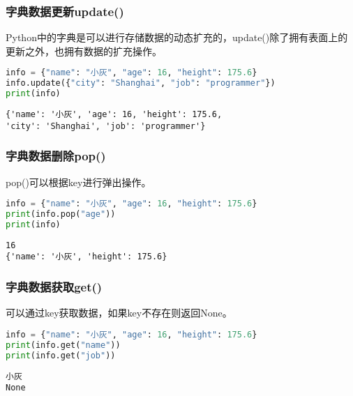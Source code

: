 \subsubsection{字典数据更新update()}

Python中的字典是可以进行存储数据的动态扩充的，update()除了拥有表面上的更新之外，也拥有数据的扩充操作。\\


\begin{lstlisting}[language=Python]
info = {"name": "小灰", "age": 16, "height": 175.6}
info.update({"city": "Shanghai", "job": "programmer"})
print(info)
\end{lstlisting}

\begin{tcolorbox}
	\begin{verbatim}
{'name': '小灰', 'age': 16, 'height': 175.6,
'city': 'Shanghai', 'job': 'programmer'}
\end{verbatim}
\end{tcolorbox}

\subsubsection{字典数据删除pop()}

pop()可以根据key进行弹出操作。\\


\begin{lstlisting}[language=Python]
info = {"name": "小灰", "age": 16, "height": 175.6}
print(info.pop("age"))
print(info)
\end{lstlisting}

\begin{tcolorbox}
	\begin{verbatim}
16
{'name': '小灰', 'height': 175.6}
\end{verbatim}
\end{tcolorbox}

\subsubsection{字典数据获取get()}

可以通过key获取数据，如果key不存在则返回None。\\


\begin{lstlisting}[language=Python]
info = {"name": "小灰", "age": 16, "height": 175.6}
print(info.get("name"))
print(info.get("job"))
\end{lstlisting}

\begin{tcolorbox}
	\begin{verbatim}
小灰
None
\end{verbatim}
\end{tcolorbox}

\newpage